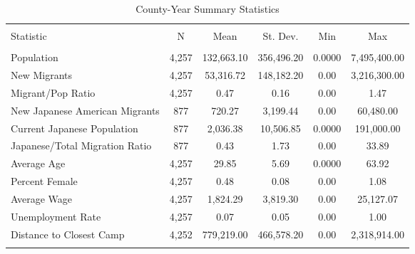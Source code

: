 
\begin{table}[!htbp] \centering 
  \caption{County-Year Summary Statistics} 
  \label{ctysumstats} 
\begin{tabular}{@{\extracolsep{5pt}}lccccc} 
\\[-1.8ex]\hline 
\hline \\[-1.8ex] 
Statistic & \multicolumn{1}{c}{N} & \multicolumn{1}{c}{Mean} & \multicolumn{1}{c}{St. Dev.} & \multicolumn{1}{c}{Min} & \multicolumn{1}{c}{Max} \\ 
\hline \\[-1.8ex] 
Population & 4,257 & 132,663.10 & 356,496.20 & 0.0000 & 7,495,400.00 \\ 
New Migrants & 4,257 & 53,316.72 & 148,182.20 & 0.00 & 3,216,300.00 \\ 
Migrant/Pop Ratio & 4,257 & 0.47 & 0.16 & 0.00 & 1.47 \\ 
New Japanese American Migrants & 877 & 720.27 & 3,199.44 & 0.00 & 60,480.00 \\ 
Current Japanese Population & 877 & 2,036.38 & 10,506.85 & 0.0000 & 191,000.00 \\ 
Japanese/Total Migration Ratio & 877 & 0.43 & 1.73 & 0.00 & 33.89 \\ 
Average Age & 4,257 & 29.85 & 5.69 & 0.0000 & 63.92 \\ 
Percent Female & 4,257 & 0.48 & 0.08 & 0.00 & 1.08 \\ 
Average Wage & 4,257 & 1,824.29 & 3,819.30 & 0.00 & 25,127.07 \\ 
Unemployment Rate & 4,257 & 0.07 & 0.05 & 0.00 & 1.00 \\ 
Distance to Closest Camp & 4,252 & 779,219.00 & 466,578.20 & 0.00 & 2,318,914.00 \\ 
\hline \\[-1.8ex] 
\end{tabular} 
\end{table} 
